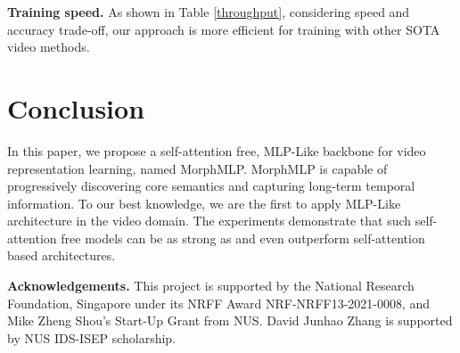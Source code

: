 \documentclass[runningheads]{llncs}
\begin{document}
\noindent\textbf{Training speed.} As shown in Table \ref{throughput}, considering speed and accuracy trade-off, our approach is more efficient for training with other SOTA video methods. 
\section{Conclusion}

In this paper, we propose a self-attention free, MLP-Like backbone for video representation learning, named MorphMLP. MorphMLP is capable of progressively discovering core semantics and capturing long-term temporal information.   To our best knowledge, we are the first to apply MLP-Like architecture in the video domain. The experiments demonstrate that  such self-attention free models can be as strong as  and even outperform self-attention based architectures.

\noindent\textbf{Acknowledgements.}
This project is supported by the National Research Foundation, Singapore under its NRFF Award NRF-NRFF13-2021-0008, and Mike Zheng Shou's Start-Up Grant from NUS. David Junhao Zhang is supported by NUS IDS-ISEP scholarship.





 
\clearpage


\end{document}
